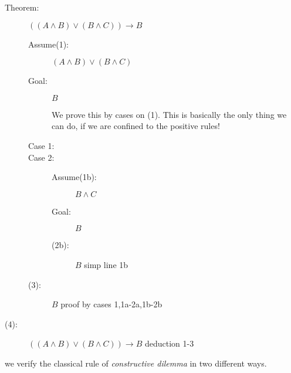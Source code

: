 \documentclass[12pt]{article}
\begin{document}
\begin{description}

\item[Theorem:]  $((A \wedge B) \vee (B \wedge C)) \rightarrow B$

\begin{description}

\item[Assume(1):]  $(A \wedge B) \vee (B \wedge C)$

\item[Goal:]  $B$

We prove this by cases on (1).  This is basically the only thing we can do, if we are confined to the positive rules!

\item[Case 1:]



\item[Case 2:]  

\begin{description}

\item[Assume(1b):]  $B \wedge C$

\item[Goal:]  $B$

\item[(2b):]  $B$  simp line 1b
\end{description}

\item[(3):]  $B$ proof by cases 1,1a-2a,1b-2b

\end{description}

\item[(4):]  $((A \wedge B) \vee (B \wedge C)) \rightarrow B$ deduction 1-3

\end{description}

we verify the classical rule of {\em constructive dilemma\/} in two different ways.
\end{document}
